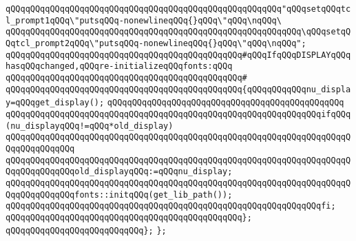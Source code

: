 \verb|qQQqqQQqqQQqqQQqqQQqqQQqqQQqqQQqqQQqqQQqqQQqqQQqqQQqqQQq"qQQqsetqQQqtcl_prompt1qQQq\"putsqQQq-nonewlineqQQq{}qQQq\"qQQq\nqQQq\|\newline
\verb|qQQqqQQqqQQqqQQqqQQqqQQqqQQqqQQqqQQqqQQqqQQqqQQqqQQqqQQqqQQq\qQQqsetqQQqtcl_prompt2qQQq\"putsqQQq-nonewlineqQQq{}qQQq\"qQQq\nqQQq";|\newline
\newline
\verb|qQQqqQQqqQQqqQQqqQQqqQQqqQQqqQQqqQQqqQQqqQQqqQQq#qQQqIfqQQqDISPLAYqQQqhasqQQqchanged,qQQqre-initializeqQQqfonts:qQQq|\newline
\verb|qQQqqQQqqQQqqQQqqQQqqQQqqQQqqQQqqQQqqQQqqQQqqQQq#|\newline
\verb|qQQqqQQqqQQqqQQqqQQqqQQqqQQqqQQqqQQqqQQqqQQqqQQq{qQQqqQQqqQQqnu_display=qQQqget_display();|\newline
\verb|qQQqqQQqqQQqqQQqqQQqqQQqqQQqqQQqqQQqqQQqqQQqqQQq|\newline
\verb|qQQqqQQqqQQqqQQqqQQqqQQqqQQqqQQqqQQqqQQqqQQqqQQqqQQqqQQqqQQqqQQqifqQQq(nu_displayqQQq!=qQQq*old_display)|\newline
\verb|qQQqqQQqqQQqqQQqqQQqqQQqqQQqqQQqqQQqqQQqqQQqqQQqqQQqqQQqqQQqqQQqqQQqqQQqqQQqqQQqqQQq|\newline
\verb|qQQqqQQqqQQqqQQqqQQqqQQqqQQqqQQqqQQqqQQqqQQqqQQqqQQqqQQqqQQqqQQqqQQqqQQqqQQqqQQqqQQqold_displayqQQq:=qQQqnu_display;|\newline
\verb|qQQqqQQqqQQqqQQqqQQqqQQqqQQqqQQqqQQqqQQqqQQqqQQqqQQqqQQqqQQqqQQqqQQqqQQqqQQqqQQqqQQqfonts::initqQQq(get_lib_path());|\newline
\verb|qQQqqQQqqQQqqQQqqQQqqQQqqQQqqQQqqQQqqQQqqQQqqQQqqQQqqQQqqQQqqQQqfi;|\newline
\verb|qQQqqQQqqQQqqQQqqQQqqQQqqQQqqQQqqQQqqQQqqQQqqQQq};|\newline
\verb|qQQqqQQqqQQqqQQqqQQqqQQqqQQq};|\newline
\newline
\verb|};|\newline
\newline
\newline
\newline
\newline

